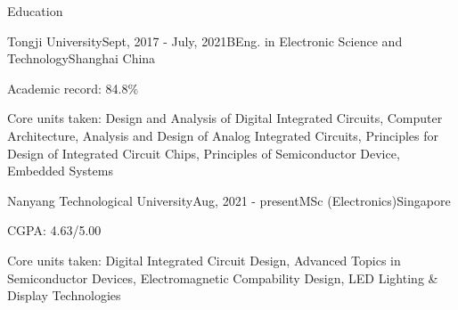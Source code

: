 \documentclass{resume} %
\begin{document}

\begin{rSection}{Education}
	
	\begin{rSubsection}{Tongji University}{Sept, 2017 - July, 2021}{BEng. in Electronic Science and Technology}{Shanghai China}
		\item Academic record: 84.8\% 
		\item Core units taken: Design and Analysis of Digital Integrated Circuits, Computer Architecture, Analysis and Design of Analog Integrated Circuits, Principles for Design of Integrated Circuit Chips, Principles of Semiconductor Device, Embedded Systems
	\end{rSubsection}

	\begin{rSubsection}{Nanyang Technological University}{Aug, 2021 - present}{MSc (Electronics)}{Singapore}
		\item CGPA: 4.63/5.00
		\item Core units taken: Digital Integrated Circuit Design, Advanced Topics in Semiconductor Devices, Electromagnetic Compability Design, LED Lighting \& Display Technologies%
	\end{rSubsection}

\end{rSection}
\end{document}
